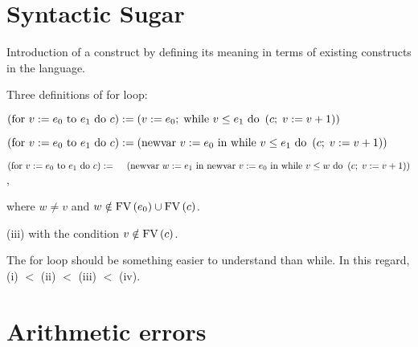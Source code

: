 \section{Syntactic Sugar}

\begin{enumcirc}
	\item
	Introduction of a construct by defining its meaning in terms of existing
	constructs in the language.
	\item
	Three definitions of for loop:
	\begin{enumrm}
		\item
		$
			\prths{
				\cfor{v}{e_0}{e_1}{c}} :=
			\prths{
				\cseq{
					\cassign{v}{e_0}
				}{
					\cwhile{v \le e_1}{
						\prths{
							\cseq{c}{\cassign{v}{v + 1}}
						}
					}
				}
			}
		$
		\item
		$
			\prths{
				\cfor{v}{e_0}{e_1}{c}} :=
			\prths{
				\cnew{v}{e_0}{
					\cwhile{v \le e_1}{
						\prths{
							\cseq{c}{\cassign{v}{v + 1}}
						}
					}
				}
			}
		$
		\item
		$
			\prths{
				\cfor{v}{e_0}{e_1}{c}} := \\
			\textrm{\quad}
			\prths{
				\cnew{w}{e_1}{
					\cnew{v}{e_0}{
						\cwhile{v \le w}{
							\prths{
								\cseq{c}{\cassign{v}{v + 1}}
							}
						}
					}
				}
			}
		$,

		where $w \ne v$ and $w \notin \textrm{FV}\left(  e_0  \right) \cup \textrm{FV}\left(  c  \right)$.
		\item
		      (iii) with the condition $v \notin \textrm{FV}\left(  c  \right)$.
	\end{enumrm}
	\item
	The for loop should be something easier to understand than while.
	In this regard, (i) $<$ (ii) $<$ (iii) $<$ (iv).
\end{enumcirc}

\section{Arithmetic errors}

